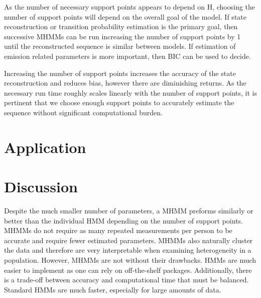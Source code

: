 \documentclass{article}
\begin{document}
As the number of necessary support points appears to depend on H, choosing the number of support points will depend on the overall goal of the model. If state reconstruction or transition probability estimation is the primary goal, then successive MHMMs can be run increasing the number of support points by 1 until the reconstructed sequence is similar between models. If estimation of emission related parameters is more important, then BIC can be used to decide.  

Increasing the number of support points increases the accuracy of the state reconstruction and reduces bias, however there are diminishing returns. As the necessary run time roughly scales linearly with the number of support points, it is pertinent that we choose enough support points to accurately estimate the sequence without significant computational burden. 

\pagebreak

\section{Application}

\section{Discussion}

Despite the much smaller number of parameters, a MHMM preforms similarly or better than the individual HMM depending on the number of support points. MHMMs do not require as many repeated measurements per person to be accurate and require fewer estimated parameters. MHMMs also naturally cluster the data and therefore are very interpretable when examining heterogeneity in a population. However, MHMMs are not without their drawbacks. HMMs are much easier to implement as one can rely on off-the-shelf packages. Additionally, there is a trade-off between accuracy and computational time that must be balanced. Standard HMMs are much faster, especially for large amounts of data. 



\end{document}
